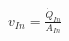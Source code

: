 \documentclass[preview]{standalone}
\begin{document}
\begin{align*}
v_{In} = \frac{\dot{Q}_{In}}{A_{In}}
\end{align*}
\end{document}
